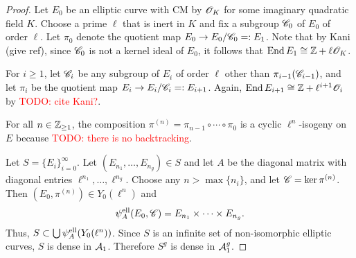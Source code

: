 \documentclass{amsart}
\begin{document}
\begin{proof}
 Let $E_0$ be an elliptic curve with CM by $\mathscr{O}_K$ for some imaginary quadratic field $K$. Choose a prime $\ell$ that is inert in $K$ and fix a subgroup $\mathscr{C}_0$ of $E_0$ of order $\ell$. Let $\pi_0$ denote the quotient map $E_0 \to E_0/\mathscr{C}_0 =: E_1$. Note that by Kani (give ref), since $\mathscr{C}_0$ is not a kernel ideal of $E_0$, it follows that $\operatorname{End} E_1 \cong \mathbb{Z} + \ell\mathscr{O}_K$.

 For $i \ge 1$, let $\mathscr{C}_i$ be any subgroup of $E_i$ of order $\ell$ other than $\pi_{i-1}(\mathscr{C}_{i-1})$, and let $\pi_i$ be the quotient map $E_i \to E_i/\mathscr{C}_i =: E_{i+1}$. Again, $\operatorname{End} E_{i+1} \cong \mathbb{Z} + \ell^{i+1}\mathscr{O}_{i}$ by \textcolor{red}{TODO: cite Kani?}.

 For all $n \in \mathbb{Z}_{\ge 1}$, the composition $\pi^{(n)} = \pi_{n-1} \circ \cdots \circ \pi_0$ is a cyclic $\ell^n$-isogeny on $E$ because \textcolor{red}{TODO: there is no backtracking}.

 Let $S = \{E_i\}_{i=0}^\infty$. Let $(E_{n_1},\dots,E_{n_g}) \in S$ and let $A$ be the diagonal matrix with diagonal entries $\ell^{n_1},\dots,\ell^{n_g}$.  Choose any $n > \max\{n_i\}$, and let $\mathscr{C} = \ker \pi^{(n)}$. Then $(E_0,\pi^{(n)}) \in Y_0(\ell^n)$ and
 \[
   \psi_{A}^\mathrm{ell}(E_0,\mathscr{C}) = E_{n_1} \times \cdots \times E_{n_g}.
 \]
Thus, $S \subset \bigcup\psi_{A}^\mathrm{ell}(Y_0(\ell^n))$. Since $S$ is an infinite set of non-isomorphic elliptic curves, $S$ is dense in $\mathcal{A}_1$. Therefore $S^g$ is dense in $\mathcal{A}_1^g$.
\end{proof}



\end{document}
